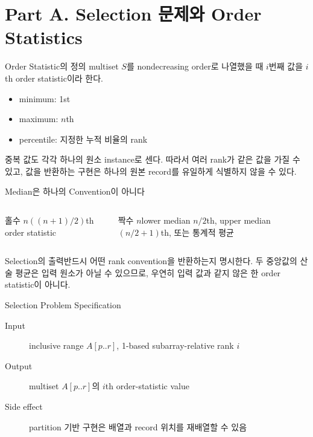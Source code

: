 \section{Part A. Selection 문제와 Order Statistics}
\begin{frame}{Order Statistic의 정의}
multiset $S$를 nondecreasing order로 나열했을 때 $i$번째 값을 \alert{$i$th order statistic}이라 한다.
\begin{itemize}\item minimum: 1st\item maximum: $n$th\item percentile: 지정한 누적 비율의 rank\end{itemize}
중복 값도 각각 하나의 원소 instance로 센다. 따라서 여러 rank가 같은 값을 가질 수 있고,
값을 반환하는 구현은 하나의 원본 record를 유일하게 식별하지 않을 수 있다.
\end{frame}
\begin{frame}{Median은 하나의 Convention이 아니다}
\begin{columns}[T]\begin{block}{홀수 $n$}$((n+1)/2)$th order statistic\end{block}\begin{block}{짝수 $n$}lower median $n/2$th, upper median $(n/2+1)$th, 또는 통계적 평균\end{block}\end{columns}
\vspace{4mm}\begin{alertblock}{Selection의 출력}반드시 어떤 rank convention을 반환하는지 명시한다. 두 중앙값의 산술 평균은 입력 원소가 아닐 수 있으므로, 우연히 입력 값과 같지 않은 한 order statistic이 아니다.\end{alertblock}
\end{frame}
\begin{frame}{Selection Problem Specification}
\begin{description}
\item[Input] inclusive range $A[p..r]$, 1-based subarray-relative rank $i$
\item[Output] multiset $A[p..r]$의 $i$th order-statistic value
\item[Side effect] partition 기반 구현은 배열과 record 위치를 재배열할 수 있음
\end{description}
\vfill{}
\end{frame}
